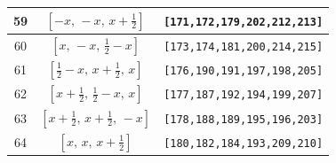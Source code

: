 \documentclass[fleqn,8pt]{jsarticle}
\begin{document}
\begin{longtable}{ccc}
59 & $\left[ - x,\, - x,\, x + \frac{1}{2} \right]$ & {\tt [171,172,179,202,212,213]} \\ \hline
60 & $\left[ x,\, - x,\, \frac{1}{2} - x \right]$ & {\tt [173,174,181,200,214,215]} \\ \hline
61 & $\left[ \frac{1}{2} - x,\, x + \frac{1}{2},\, x \right]$ & {\tt [176,190,191,197,198,205]} \\ \hline
62 & $\left[ x + \frac{1}{2},\, \frac{1}{2} - x,\, x \right]$ & {\tt [177,187,192,194,199,207]} \\ \hline
63 & $\left[ x + \frac{1}{2},\, x + \frac{1}{2},\, - x \right]$ & {\tt [178,188,189,195,196,203]} \\ \hline
64 & $\left[ x,\, x,\, x + \frac{1}{2} \right]$ & {\tt [180,182,184,193,209,210]} \\
\end{longtable}
\renewcommand{\arraystretch}{1.2}
\end{document}
